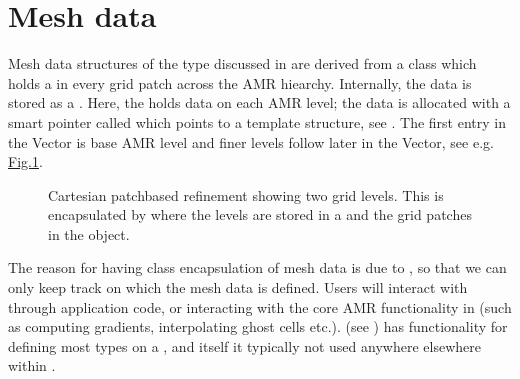 \documentclass[letterpaper,10pt,english]{sphinxmanual}
\let\sphinxpxdimen\pdfpxdimen\else\newdimen\sphinxpxdimen
\begin{document}
\section{Mesh data}
\label{\detokenize{Source/MeshData:mesh-data}}\label{\detokenize{Source/MeshData:chap-meshdata}}\label{\detokenize{Source/MeshData::doc}}
\sphinxAtStartPar
Mesh data structures of the type discussed in {\hyperref[\detokenize{Source/SpatialDiscretization:chap-spatialdiscretization}]{}} are derived from a class  which holds a  in every grid patch across the AMR hiearchy.
Internally, the data is stored as a .
Here, the  holds data on each AMR level; the data is allocated with a smart pointer called  which points to a  template structure, see {\hyperref[\detokenize{Source/ChomboBasics:chap-basics}]{}}.
The first entry in the Vector is base AMR level and finer levels follow later in the Vector, see e.g. \hyperref[\detokenize{Source/MeshData:fig-ebamrdata}]{Fig.\@ \ref{\detokenize{Source/MeshData:fig-ebamrdata}}}.

\begin{figure}[htb]
\centering
\capstart

\noindent\sphinxincludegraphics[width=480\sphinxpxdimen]{{PatchBasedAMR}.png}
\caption{Cartesian patch\sphinxhyphen{}based refinement showing two grid levels.
This is encapsulated by  where the levels are stored in a  and the grid patches in the  object.}\label{\detokenize{Source/MeshData:id3}}\label{\detokenize{Source/MeshData:fig-ebamrdata}}\end{figure}

\sphinxAtStartPar
The reason for having class encapsulation of mesh data is due to {\hyperref[\detokenize{Source/Realm:chap-realm}]{}}, so that we can only keep track on which  the mesh data is defined.
Users will interact with  through application code, or interacting with the core AMR functionality in {\hyperref[\detokenize{Source/AmrMesh:chap-amrmesh}]{}} (such as computing gradients, interpolating ghost cells etc.).
 (see {\hyperref[\detokenize{Source/AmrMesh:chap-amrmesh}]{}}) has functionality for defining most  types on a , and  itself it typically not used anywhere elsewhere within .
\end{document}
